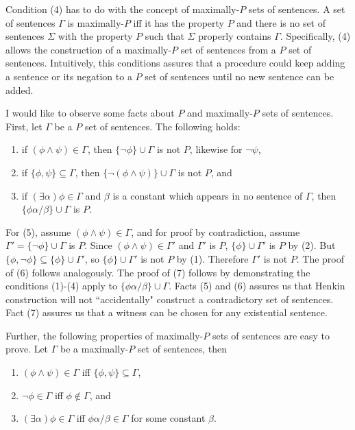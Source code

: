 \documentclass[12pt]{article}
\theoremstyle{definition}
\theoremstyle{remark}
\begin{document}
Condition (4) has to do with the concept of maximally-$P$ sets of sentences. A set of sentences $\Gamma$ is maximally-$P$ iff it has the property $P$ and there is no set of sentences $\Sigma$ with the property $P$ such that $\Sigma$ properly contains $\Gamma$. Specifically, (4) allows the construction of a maximally-$P$ set of sentences from a $P$ set of sentences. Intuitively, this conditions assures that a procedure could keep adding a sentence or its negation to a $P$ set of sentences until no new sentence can be added.

I would like to observe some facts about $P$ and maximally-$P$ sets of sentences. First, let $\Gamma$ be a $P$ set of sentences. The following holds:

\begin{enumerate}
	\item[(5)] if $(\phi \land \psi) \in \Gamma$, then $\{ \neg\phi \} \cup \Gamma$ is not $P$, likewise for $\neg\psi$,
	\item[(6)] if $\{ \phi, \psi \} \subseteq \Gamma$, then $\{ \neg(\phi \land \psi) \} \cup \Gamma$ is not $P$, and
	\item[(7)] if $(\exists \alpha)\phi \in \Gamma$ and $\beta$ is a constant which appears in no sentence of $\Gamma$, then $\{ \phi\alpha/\beta \} \cup \Gamma$ is $P$.
\end{enumerate}

For (5), assume $(\phi \land \psi) \in \Gamma$, and for proof by contradiction, assume $\Gamma' = \{ \neg\phi \} \cup \Gamma$ is $P$. Since $(\phi \land \psi) \in \Gamma'$ and $\Gamma'$ is $P$, $\{ \phi \} \cup \Gamma'$ is $P$ by (2). But $\{ \phi, \neg\phi \} \subseteq \{ \phi \} \cup \Gamma'$, so $\{ \phi \} \cup \Gamma'$ is not $P$ by (1). Therefore $\Gamma'$ is not $P$. The proof of (6) follows analogously. The proof of (7) follows by demonstrating the conditions (1)-(4) apply to $\{ \phi\alpha/\beta \} \cup \Gamma$. Facts (5) and (6) assures us that Henkin construction will not ``accidentally" construct a contradictory set of sentences. Fact (7) assures us that a witness can be chosen for any existential sentence. 

Further, the following properties of maximally-$P$ sets of sentences are easy to prove. Let $\Gamma$ be a maximally-$P$ set of sentences, then

\begin{enumerate}
	\item[(8)] $(\phi \land \psi) \in \Gamma$ iff $\{ \phi, \psi \} \subseteq \Gamma$,
	\item[(9)] $\neg\phi \in \Gamma$ iff $\phi \not\in \Gamma$, and
	\item[(10)] $(\exists \alpha)\phi \in \Gamma$ iff $\phi\alpha/\beta \in \Gamma$ for some constant $\beta$.
\end{enumerate}
\end{document}
